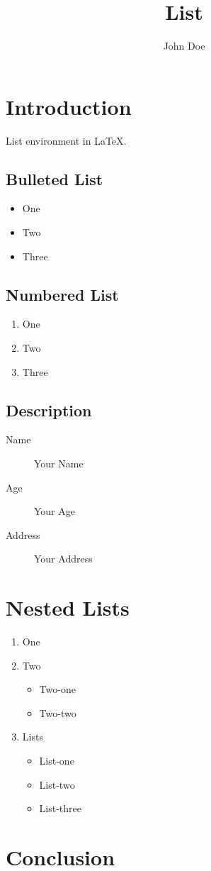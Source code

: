 \documentclass{article}
\title{List}
\author{John Doe}
\date{}
\begin{document}
\maketitle

\section{Introduction}
List environment in \LaTeX.

\subsection{Bulleted List}

\begin{itemize}
	\item One
	\item Two
	\item Three
\end{itemize}

\subsection{Numbered List}

\begin{enumerate}
	\item One
	\item Two
	\item Three
\end{enumerate}

\subsection{Description}

\begin{description}
	\item[Name] Your Name
	\item[Age] Your Age
	\item[Address] Your Address
\end{description}

\section{Nested Lists}

\begin{enumerate}
	\item One
	\item Two
	      \begin{itemize}
		      \item Two-one
		      \item Two-two
	      \end{itemize}
	\item Lists
	      \begin{itemize}
		      \item List-one
		      \item List-two
		      \item List-three
	      \end{itemize}
\end{enumerate}

\section{Conclusion}
\end{document}
